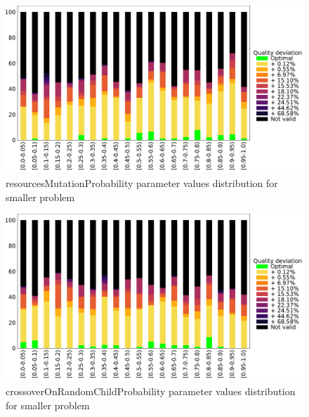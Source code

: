 
\begin{figure}
	\centering
	\includegraphics[width=\textwidth]{images/DistrObj/resourcesMutationProbability.pdf}
	\caption[resourcesMutationProbability parameter values distribution for smaller problem]{resourcesMutationProbability parameter values distribution for smaller problem}
	\label{fig:resourcesMutationProbability_Obj}
\end{figure}

\begin{figure}
	\centering
	\includegraphics[width=\textwidth]{images/DistrObj/crossoverOnRandomChildProbability.pdf}
	\caption[crossoverOnRandomChildProbability parameter values distribution for smaller problem]{crossoverOnRandomChildProbability parameter values distribution for smaller problem}
	\label{fig:crossoverOnRandomChildProbability_Obj}
\end{figure}


